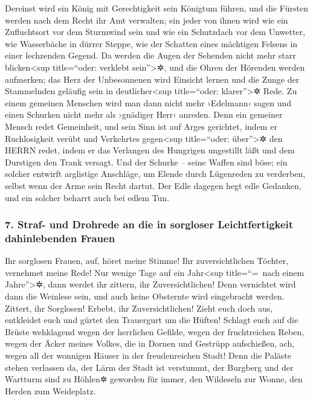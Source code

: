 Dereinst wird ein König mit Gerechtigkeit sein Königtum
führen, und die Fürsten werden nach dem Recht ihr Amt verwalten;
ein jeder von ihnen wird wie ein Zufluchtsort vor dem
Sturmwind sein und wie ein Schutzdach vor dem Unwetter, wie Wasserbäche
in dürrer Steppe, wie der Schatten eines mächtigen Felsens in einer
lechzenden Gegend. Da werden die Augen der Sehenden nicht
mehr starr blicken\textless sup title=``oder: verklebt
sein''\textgreater✲, und die Ohren der Hörenden werden aufmerken;
das Herz der Unbesonnenen wird Einsicht lernen und die
Zunge der Stammelnden geläufig sein in deutlicher\textless sup
title=``oder: klarer''\textgreater✲ Rede. Zu einem
gemeinen Menschen wird man dann nicht mehr ›Edelmann‹ sagen und einen
Schurken nicht mehr als ›gnädiger Herr‹ anreden. Denn ein
gemeiner Mensch redet Gemeinheit, und sein Sinn ist auf Arges gerichtet,
indem er Ruchlosigkeit verübt und Verkehrtes gegen\textless sup
title=``oder: über''\textgreater✲ den HERRN redet, indem er das
Verlangen des Hungrigen ungestillt läßt und dem Durstigen den Trank
versagt. Und der Schurke -- seine Waffen sind böse; ein
solcher entwirft arglistige Anschläge, um Elende durch Lügenreden zu
verderben, selbst wenn der Arme sein Recht dartut. Der
Edle dagegen hegt edle Gedanken, und ein solcher beharrt auch bei edlem
Tun.

\hypertarget{straf--und-drohrede-an-die-in-sorgloser-leichtfertigkeit-dahinlebenden-frauen}{%
\subsubsection{7. Straf- und Drohrede an die in sorgloser
Leichtfertigkeit dahinlebenden
Frauen}\label{straf--und-drohrede-an-die-in-sorgloser-leichtfertigkeit-dahinlebenden-frauen}}

Ihr sorglosen Frauen, auf, höret meine Stimme! Ihr
zuversichtlichen Töchter, vernehmet meine Rede! Nur
wenige Tage auf ein Jahr\textless sup title=``=~nach einem
Jahre''\textgreater✲, dann werdet ihr zittern, ihr Zuversichtlichen!
Denn vernichtet wird dann die Weinlese sein, und auch keine Obsternte
wird eingebracht werden. Zittert, ihr Sorglosen! Erbebt,
ihr Zuversichtlichen! Zieht euch doch aus, entkleidet euch und gürtet
den Trauergurt um die Hüften! Schlagt euch auf die Brüste
wehklagend wegen der herrlichen Gefilde, wegen der fruchtreichen Reben,
wegen der Äcker meines Volkes, die in Dornen und Gestrüpp
aufschießen, ach, wegen all der wonnigen Häuser in der freudenreichen
Stadt! Denn die Paläste stehen verlassen da, der Lärm der
Stadt ist verstummt, der Burgberg und der Wartturm sind zu Höhlen✲
geworden für immer, den Wildeseln zur Wonne, den Herden zum Weideplatz.

